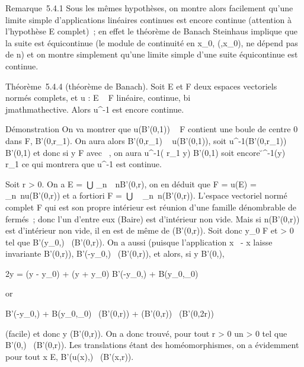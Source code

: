 \documentclass[]{article}
\begin{document}
Remarque~5.4.1 Sous les mêmes hypothèses, on montre alors facilement
qu'une limite simple d'applications linéaires continues est encore
continue (attention à l'hypothèse E complet)~; en effet le théorème de
Banach Steinhaus implique que la suite est équicontinue (le module de
continuité en x_0, \eta(\epsilon,x_0), ne dépend pas de n) et on
montre simplement qu'une limite simple d'une suite équicontinue est
continue.

Théorème~5.4.4 (théorème de Banach). Soit E et F deux espaces vectoriels
normés complets, et u : E \rightarrow~ F linéaire, continue, bi\\jmathmathective. Alors
u^-1 est encore continue.

Démonstration On va montrer que u(B'(0,1)) \subset~ F contient une boule de
centre 0 dans F, B'(0,r_1). On aura alors B'(0,r_1) \subset~
u(B'(0,1)), soit u^-1(B'(0,r_1)) \subset~ B'(0,1) et donc
si y \in F avec \y\ ,
on aura u^-1( r_1  y) \in
B'(0,1) soit encore
\u^-1(y)\
 \over r_1 ce qui montrera que
u^-1 est continue.

Soit r \textgreater{} 0. On a E =  _n\in{}~~nB'(0,r), on en déduit que F =
u(E) = \⋃ ~
_n\in{}~nu(B'(0,r)) et a fortiori F =\
⋃ ~
_n\in\mathbb{N}~n\overlineu(B'(0,r)). L'espace vectoriel
normé complet F qui est son propre intérieur est réunion d'une famille
dénombrable de fermés~; donc l'un d'entre eux (Baire) est d'intérieur
non vide. Mais si n\overlineu(B'(0,r)) est
d'intérieur non vide, il en est de même de
\overlineu(B'(0,r)). Soit donc y_0 \in F et \rho
\textgreater{} 0 tel que B'(y_0,\rho)
\subset~\overlineu(B'(0,r)). On a aussi (puisque
l'application x\mapsto~ - x laisse invariante
B'(0,r)), B'(-y_0,\rho) \subset~\overlineu(B'(0,r)),
et alors, si y \in B'(0,\rho),

2y = (y - y_0) + (y + y_0) \in B'(-y_0,\rho) +
B(y_0,\rho_0)

or

B'(-y_0,\rho) + B(y_0,\rho_0)
\subset~\overlineu(B'(0,r)) +
\overlineu(B'(0,r))
\subset~\overlineu(B'(0,2r))

(facile) et donc y \in\overlineu(B'(0,r)). On a donc
trouvé, pour tout r \textgreater{} 0 un \rho \textgreater{} 0 tel que
B'(0,\rho) \subset~\overlineu(B'(0,r)). Les translations étant
des homéomorphismes, on a évidemment pour tout x \in E, B'(u(x),\rho)
\subset~\overlineu(B'(x,r)).
\end{document}
